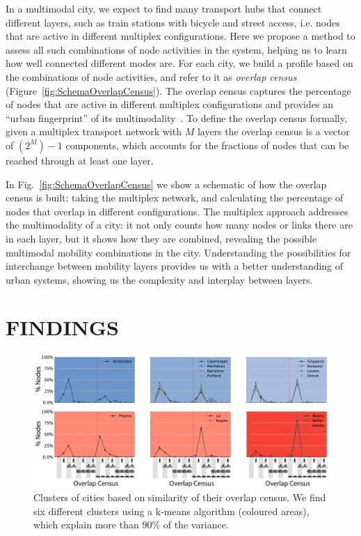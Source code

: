 In a multimodal city, we expect to find many transport hubs that connect different layers, such as train stations with bicycle and street access, i.e. nodes that are active in different multiplex configurations. Here we propose a method to assess all such combinations of node activities in the system, helping us to learn how well connected different modes are. For each city, we build a profile based on the combinations of node activities, and refer to it as \emph{overlap census} (Figure~\ref{fig:SchemaOverlapCensus}). The overlap census captures the percentage of nodes that are active in different multiplex configurations and provides an ``urban fingerprint'' of its multimodality~\cite{Aleta2017Multilayer}. To define the overlap census formally, given a multiplex transport network with $M$ layers the overlap census is a vector of $(2^M)-1$ components, which accounts for the fractions of nodes that can be reached through at least one layer.

In Fig.~\ref{fig:SchemaOverlapCensus} we show a schematic of how the overlap census is built: taking the multiplex network, and calculating the percentage of nodes that overlap in different configurations. The multiplex approach addresses the multimodality of a city: it not only counts how many nodes or links there are in each layer, but it shows how they are combined, revealing the possible multimodal mobility combinations in the city. Understanding the possibilities for interchange between mobility layers provides us with a better understanding of urban systems, showing us the complexity and interplay between layers.


\section{FINDINGS}

\begin{figure}[t!]
	\centering
	\includegraphics[width=\textwidth]{images/multiplex/ResultsOverlapCensus-01.png}
	\caption[Overlap Census clusters]{
		Clusters of cities based on similarity of their overlap census. We find six different clusters using a k-means algorithm (coloured areas), which explain more than $90\%$ of the variance.
		}
	\label{fig:ResultsOverlapCensus}
\end{figure}

